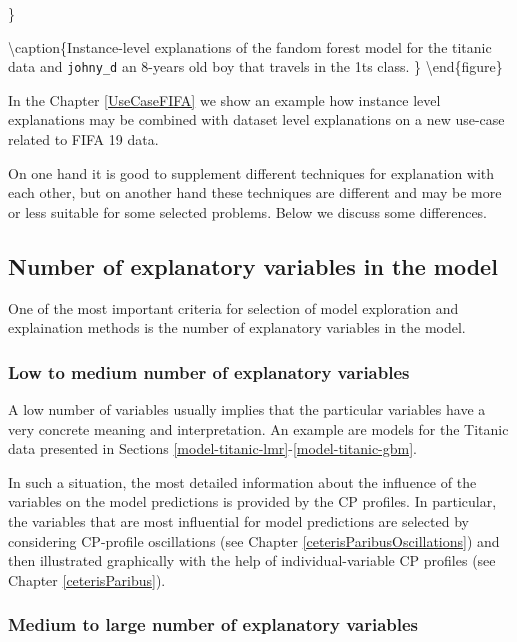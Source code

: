 \documentclass[12pt,]{krantz}
\begin{document}
\}

\textbackslash{}caption\{Instance-level explanations of the fandom forest model for the titanic data and \texttt{johny\_d} an 8-years old boy that travels in the 1ts class. \}\label{fig:instanceLevelExplainers}
\textbackslash{}end\{figure\}

In the Chapter \ref{UseCaseFIFA} we show an example how instance level explanations may be combined with dataset level explanations on a new use-case related to FIFA 19 data.

On one hand it is good to supplement different techniques for explanation with each other, but on another hand these techniques are different and may be more or less suitable for some selected problems. Below we discuss some differences.

\hypertarget{number-of-explanatory-variables-in-the-model}{%
\subsection{Number of explanatory variables in the model}\label{number-of-explanatory-variables-in-the-model}}

One of the most important criteria for selection of model exploration and explaination methods is the number of explanatory variables in the model.

\hypertarget{low-to-medium-number-of-explanatory-variables}{%
\subsubsection{Low to medium number of explanatory variables}\label{low-to-medium-number-of-explanatory-variables}}

A low number of variables usually implies that the particular variables have a very concrete meaning and interpretation. An example are models for the Titanic data presented in Sections \ref{model-titanic-lmr}-\ref{model-titanic-gbm}.

In such a situation, the most detailed information about the influence of the variables on the model predictions is provided by the CP profiles. In particular, the variables that are most influential for model predictions are selected by considering CP-profile oscillations (see Chapter \ref{ceterisParibusOscillations}) and then illustrated graphically with the help of individual-variable CP profiles (see Chapter \ref{ceterisParibus}).

\hypertarget{medium-to-large-number-of-explanatory-variables}{%
\subsubsection{Medium to large number of explanatory variables}\label{medium-to-large-number-of-explanatory-variables}}
\end{document}
